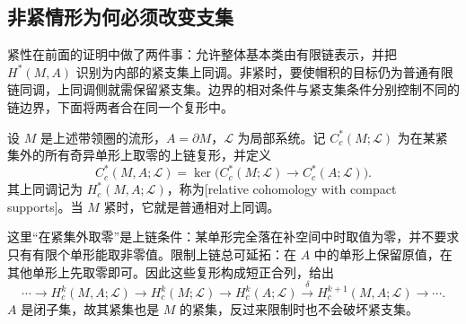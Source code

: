 \subsection{非紧情形为何必须改变支集}
\label{g2:subsec:0604:04}
紧性在前面的证明中做了两件事：允许整体基本类由有限链表示，并把 \(H^*(M,A)\) 识别为内部的紧支集上同调。非紧时，要使帽积的目标仍为普通有限链同调，上同调侧就需保留紧支集。边界的相对条件与紧支集条件分别控制不同的链边界，下面将两者合在同一个复形中。

\begin{definition}\label{g2:def:relative-compact-cohomology}
	设 \(M\) 是上述带领圈的流形，\(A=\partial M\)，\(\mathcal L\) 为局部系统。记 \(C_c^*(M;\mathcal L)\) 为在某紧集外的所有奇异单形上取零的上链复形，并定义
	\[
		C_c^*(M,A;\mathcal L)
		=\ker\bigl(C_c^*(M;\mathcal L)\longrightarrow C_c^*(A;\mathcal L)\bigr).
	\]
	其上同调记为 \(H_c^*(M,A;\mathcal L)\)，称为[relative cohomology with compact supports]。当 \(M\) 紧时，它就是普通相对上同调。
\end{definition}

这里“在紧集外取零”是上链条件：某单形完全落在补空间中时取值为零，并不要求只有有限个单形能取非零值。限制上链总可延拓：在 \(A\) 中的单形上保留原值，在其他单形上先取零即可。因此这些复形构成短正合列，给出
\begin{equation}\label{g2:eq:compact-boundary-LES}
	\cdots\to H_c^k(M,A;\mathcal L)\to H_c^k(M;\mathcal L)
	\to H_c^k(A;\mathcal L)\xrightarrow{\delta}H_c^{k+1}(M,A;\mathcal L)\to\cdots.
\end{equation}
\(A\) 是闭子集，故其紧集也是 \(M\) 的紧集，反过来限制时也不会破坏紧支集。

